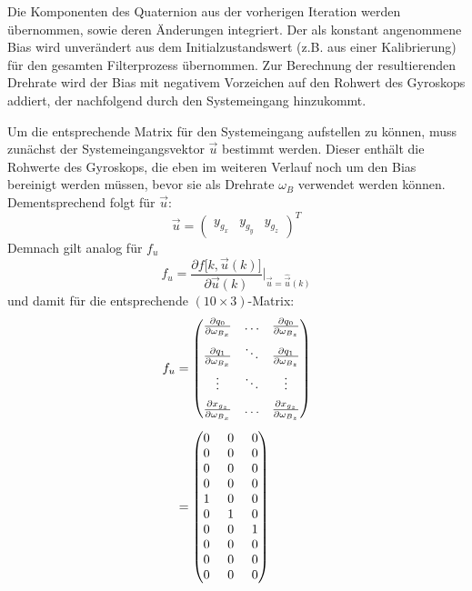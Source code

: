\documentclass[12pt,a4paper]{article}
\newcommand{\PA}[2]{\frac{\partial #1}{\partial #2}}
\begin{document}
		Die Komponenten des Quaternion aus der vorherigen Iteration werden übernommen, sowie deren Änderungen integriert. Der als konstant angenommene Bias wird unverändert aus dem Initialzustandswert (z.B. aus einer Kalibrierung) für den gesamten Filterprozess übernommen. Zur Berechnung der resultierenden Drehrate wird der Bias mit negativem Vorzeichen auf den Rohwert des Gyroskops addiert, der nachfolgend durch den Systemeingang hinzukommt.
			
		Um die entsprechende Matrix für den Systemeingang aufstellen zu können, muss zunächst der Systemeingangsvektor $\vec{u}$ bestimmt werden. Dieser enthält die Rohwerte des Gyroskops, die eben im weiteren Verlauf noch um den Bias bereinigt werden müssen, bevor sie als Drehrate $\omega_{B}$ verwendet werden können. Dementsprechend folgt für $\vec{u}$:
		\begin{equation}\label{eq:Systemeingangsvektor}
			\vec{u}=\begin{pmatrix}
			y_{g_{x}} & y_{g_{y}} & y_{g_{z}}
			\end{pmatrix}^{T}
		\end{equation}
		Demnach gilt analog für $f_{u}$
		\begin{equation}\label{eq:JacobiMatrixDefinitionSystemeingangsmatrix}
			f_{u}=\frac{\partial f\big[k,\vec{u}(k)\big]}{\partial \vec{u}(k)}\Bigg \vert_{\vec{u}=\hat{\vec{u}}(k)}
		\end{equation}
		und damit für die entsprechende $(10\times 3)$-Matrix:
		\begin{equation}
			\begin{split}
				f_{u}&=\begin{pmatrix}
				\PA{q_{0}}{\omega_{B_{x}}} & \ldots & \PA{q_{0}}{\omega_{B_{z}}}\\[0.5em]
				\PA{q_{1}}{\omega_{B_{x}}} & \ddots & \PA{q_{1}}{\omega_{B_{z}}} \\[0.5em]
				\vdots & \ddots & \vdots \\[0.5em]
				\PA{x_{g_{z}}}{\omega_{B_{x}}} & \ldots & \PA{x_{g_{z}}}{\omega_{B_{z}}} 
				\end{pmatrix}\\[0.5em]
				&=
				\setlength{\arraycolsep}{7pt}
				\begin{pmatrix}
				0 & 0 & 0 \\
				0 & 0 & 0 \\
				0 & 0 & 0 \\
				0 & 0 & 0 \\
				1 & 0 & 0 \\
				0 & 1 & 0 \\
				0 & 0 & 1 \\
				0 & 0 & 0 \\
				0 & 0 & 0 \\
				0 & 0 & 0
				\end{pmatrix}
			\end{split}
		\end{equation}
\end{document}
